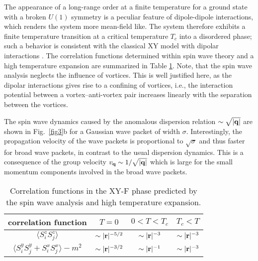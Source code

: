 The appearance of a long-range order at a finite temperature for a ground state with a broken $U(1)$ symmetry is
a peculiar feature of dipole-dipole interactions, which renders the system more mean-field like.  The system therefore
exhibits a finite temperature transition at a critical temperature $T_{c}$ into a disordered phase; such a behavior is
consistent with the classical XY model with dipolar interactions \cite{bruno01}. The correlation functions determined
within spin wave theory and a high temperature expansion are summarized in Table \ref{table2}.
 Note, that the spin wave analysis neglects the influence of vortices. This is well justified here,
as the dipolar interactions gives rise to a  confining of vortices, i.e., the interaction potential
between a vortex--anti-vortex pair increases linearly with the separation between the vortices.

The spin wave dynamics caused by the anomalous dispersion relation $\sim \sqrt{|{\bf q}|}$ are shown in Fig.~\ref{fig3}b for a Gaussian wave packet of width $\sigma$. Interestingly, the propagation velocity of the wave packets is proportional to $\sqrt{\sigma}$ and thus faster for broad wave packets, in contrast to the usual dispersion dynamics. This is a consequence of the group velocity $v_{\bf q} \sim 1/\sqrt{|{\bf q}|}$ which is large for the small momentum components involved in the broad wave packets.

\begin{table}
\begin{tabular}{c c c c}
\toprule
 correlation function &  \hspace{10pt} $T=0$    \hspace{10pt}&   \hspace{10pt} $0 < T< T_{c}$    \hspace{10pt}&   \hspace{10pt}$T_{c}< T $    \hspace{10pt}\\
 \hline
$ \langle S^{z}_{i} S^{z}_{j}\rangle$  &$ \sim |{\bf r}|^{-5/2}$  & $\sim |{\bf r}|^{-3}$ &  $\sim |{\bf r}|^{-3}$ \\
$ \langle S^{y}_{i} S^{y}_{j}+ S^{x}_{i} S^{x}_{j}\rangle- m^2$  &$ \sim |{\bf r}|^{-3/2}$ &  $\sim |{\bf r}|^{-1}$ &  $\sim |{\bf r}|^{-3}$
\end{tabular}
\caption{ \label{table2} Correlation functions in the XY-F phase predicted by the spin wave analysis and high temperature expansion. }
\end{table}






